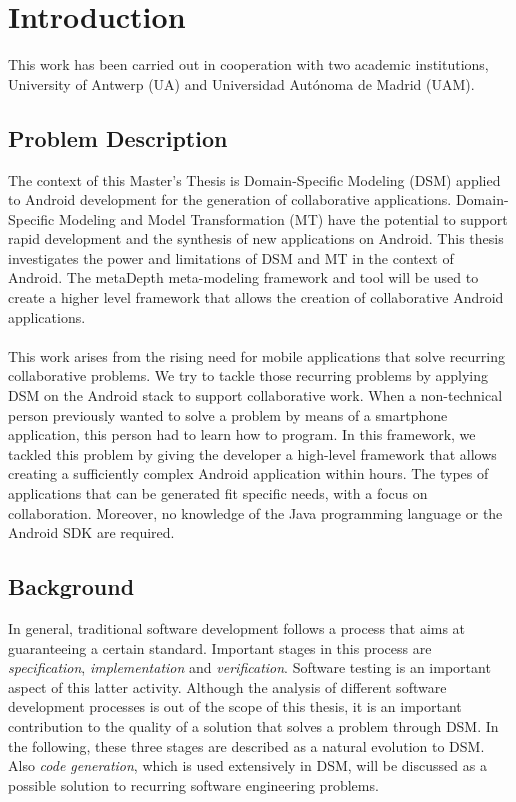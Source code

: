 \chapter{Introduction}

This work has been carried out in cooperation with two academic institutions, University of Antwerp (UA) and Universidad Aut\'onoma de Madrid (UAM).

\section{Problem Description}

The context of this Master's Thesis is Domain-Specific Modeling (DSM) applied to Android development for the generation of collaborative applications. Domain-Specific Modeling and Model Transformation (MT) have the potential to support rapid development and the synthesis of new applications on Android. This thesis investigates the power and limitations of DSM and MT in the context of Android. The metaDepth meta-modeling framework and tool will be used to create a higher level framework that allows the creation of collaborative Android applications.
\\ \\
This work arises from the rising need for mobile applications that solve recurring collaborative problems. We try to tackle those recurring problems by applying DSM on the Android stack to support collaborative work. When a non-technical person previously wanted to solve a problem by means of a smartphone application, this person had to learn how to program. In this framework, we tackled this problem by giving the developer a high-level framework that allows creating a sufficiently complex Android application within hours. The types of applications that can be generated fit specific needs, with a focus on collaboration. Moreover, no knowledge of the Java programming language or the Android SDK are required.

\section{Background}

In general, traditional software development follows a process that aims at guaranteeing a certain standard. Important stages in this process are \textit{specification}, \textit{implementation} and \textit{verification}. Software testing is an important aspect of this latter activity. Although the analysis of different software development processes is out of the scope of this thesis, it is an important contribution to the quality of a solution that solves a problem through DSM. In the following, these three stages are described as a natural evolution to DSM. Also \textit{code generation}, which is used extensively in DSM, will be discussed as a possible solution to recurring software engineering problems.

